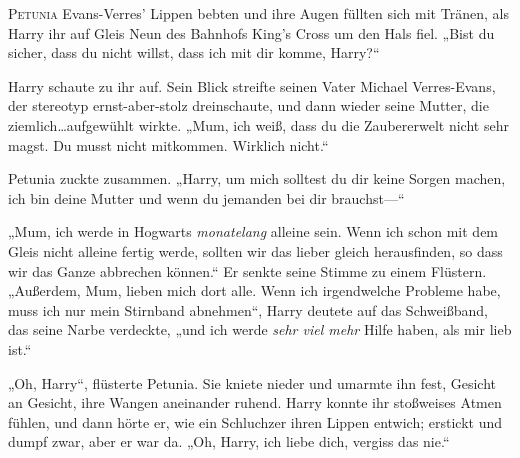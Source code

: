 \lettrine{P}{etunia} Evans-Verres’ Lippen bebten und ihre Augen füllten sich mit Tränen, als Harry ihr auf Gleis Neun des Bahnhofs King’s Cross um den Hals fiel. „Bist du sicher, dass du nicht willst, dass ich mit dir komme, Harry?“

Harry schaute zu ihr auf. Sein Blick streifte seinen Vater Michael Verres-Evans, der stereotyp ernst-aber-stolz dreinschaute, und dann wieder seine Mutter, die ziemlich…aufgewühlt wirkte. „Mum, ich weiß, dass du die Zaubererwelt nicht sehr magst. Du musst nicht mitkommen. Wirklich nicht.“

Petunia zuckte zusammen. „Harry, um mich solltest du dir keine Sorgen machen, ich bin deine Mutter und wenn du jemanden bei dir brauchst—“

„Mum, ich werde in Hogwarts \emph{monatelang} alleine sein. Wenn ich schon mit dem Gleis nicht alleine fertig werde, sollten wir das lieber gleich herausfinden, so dass wir das Ganze abbrechen können.“ Er senkte seine Stimme zu einem Flüstern. „Außerdem, Mum, lieben mich dort alle. Wenn ich irgendwelche Probleme habe, muss ich nur mein Stirnband abnehmen“, Harry deutete auf das Schweißband, das seine Narbe verdeckte, „und ich werde \emph{sehr viel mehr} Hilfe haben, als mir lieb ist.“

„Oh, Harry“, flüsterte Petunia. Sie kniete nieder und umarmte ihn fest, Gesicht an Gesicht, ihre Wangen aneinander ruhend. Harry konnte ihr stoßweises Atmen fühlen, und dann hörte er, wie ein Schluchzer ihren Lippen entwich; erstickt und dumpf zwar, aber er war da. „Oh, Harry, ich liebe dich, vergiss das nie.“

